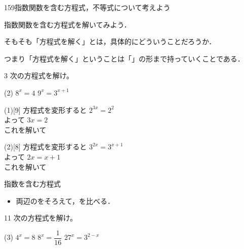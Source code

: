 \documentclass[14pt,dvipdfmx]{jsarticle}
\begin{document}
  {159}{指数関数を含む方程式，不等式について考えよう}

\setcounter{definition}{3}
\setcounter{theorem}{2}
\setcounter{technique}{2}

\vspace{-1.5zw}%
指数関数を含む方程式を解いてみよう．

そもそも「方程式を解く」とは，具体的にどういうことだろうか．

つまり「方程式を解く」ということは「」の形まで持っていくことである．

\begin{exampleprob}{3}
  次の方程式を解け。
  \begin{tasks}[label=(\arabic*), label-width=1.6zw, item-indent=2zw, after-item-skip=0.15em](2)
    \task $8^x = 4$
    \task $9^x = 3^{x+1}$
  \end{tasks}
\end{exampleprob}

\begin{answerbox}{(1)}[9]
  方程式を変形すると $2^{3x}=2^2$\\
  よって $3x=2$\\
  これを解いて
\end{answerbox}
\begin{answerbox}{(2)}[8]
  方程式を変形すると $3^{2x}=3^{x+1}$\\
  よって $2x=x+1$\\
  これを解いて
\end{answerbox}
\vspace{0.3em}

\begin{techniquebox}{指数を含む方程式}
  \begin{itemize}[leftmargin=1.5zw, itemsep=0.15em]
    \item 両辺のをそろえて，を比べる．
  \end{itemize}
\end{techniquebox}

\vfill
\nextpage

\begin{practiceprob}{11}
  次の方程式を解け。
  \begin{tasks}[label=(\arabic*), label-width=1.6zw, item-indent=2zw, after-item-skip=0.15em](3)
    \task $4^x = 8$
    \task $8^x = \dfrac{1}{16}$
    \task $27^x = 3^{2-x}$
  \end{tasks}
\end{practiceprob}
\end{document}
